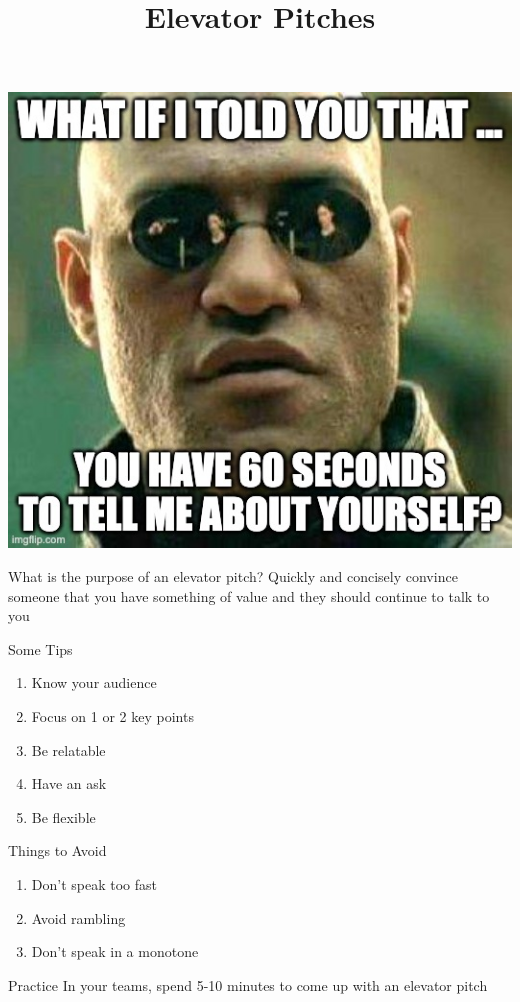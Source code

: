 \documentclass[aspectratio=169]{beamer}
\title{Elevator Pitches}
\institute{Engineers for Exploration, UC San Diego}
\begin{document}
\maketitle

\begin{frame}
    \centering
    \includegraphics[width=.8\textwidth,height=.7\textheight,keepaspectratio]{6rdmty.jpg}
\end{frame}

\begin{frame}{What is the purpose of an elevator pitch?}
    Quickly and concisely convince someone that you have something of value and they should continue to talk to you
\end{frame}

\begin{frame}{Some Tips}
    \begin{enumerate}[<+->]
        \item Know your audience
        \item Focus on 1 or 2 key points
        \item Be relatable
        \item Have an ask
        \item Be flexible
    \end{enumerate}
\end{frame}

\begin{frame}{Things to Avoid}
    \begin{enumerate}[<+->]
        \item Don't speak too fast
        \item Avoid rambling
        \item Don't speak in a monotone
    \end{enumerate}
\end{frame}

\begin{frame}{Practice}
    In your teams, spend 5-10 minutes to come up with an elevator pitch
\end{frame}
\end{document}
